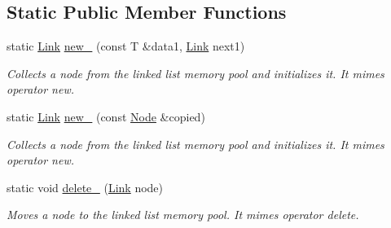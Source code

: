 \subsection*{Static Public Member Functions}
\begin{DoxyCompactItemize}
\item 
\hypertarget{structofeli_1_1list_1_1_node_ac75b630e0b50f5eee672e8a0a8aca132}{static \hyperlink{classofeli_1_1list_a7765ecb875543506d04dbd466f754503}{Link} \hyperlink{structofeli_1_1list_1_1_node_ac75b630e0b50f5eee672e8a0a8aca132}{new\-\_\-} (const T \&data1, \hyperlink{classofeli_1_1list_a7765ecb875543506d04dbd466f754503}{Link} next1)}\label{structofeli_1_1list_1_1_node_ac75b630e0b50f5eee672e8a0a8aca132}

\begin{DoxyCompactList}\small\item\em Collects a node from the linked list memory pool and initializes it. It mimes operator {\ttfamily new}. \end{DoxyCompactList}\item 
\hypertarget{structofeli_1_1list_1_1_node_a6b9d48c85eee2608978fe420d03b3e73}{static \hyperlink{classofeli_1_1list_a7765ecb875543506d04dbd466f754503}{Link} \hyperlink{structofeli_1_1list_1_1_node_a6b9d48c85eee2608978fe420d03b3e73}{new\-\_\-} (const \hyperlink{structofeli_1_1list_1_1_node}{Node} \&copied)}\label{structofeli_1_1list_1_1_node_a6b9d48c85eee2608978fe420d03b3e73}

\begin{DoxyCompactList}\small\item\em Collects a node from the linked list memory pool and initializes it. It mimes operator {\ttfamily new}. \end{DoxyCompactList}\item 
\hypertarget{structofeli_1_1list_1_1_node_a42cedc598273b73b0f2bc34f7cd10043}{static void \hyperlink{structofeli_1_1list_1_1_node_a42cedc598273b73b0f2bc34f7cd10043}{delete\-\_\-} (\hyperlink{classofeli_1_1list_a7765ecb875543506d04dbd466f754503}{Link} node)}\label{structofeli_1_1list_1_1_node_a42cedc598273b73b0f2bc34f7cd10043}

\begin{DoxyCompactList}\small\item\em Moves a node to the linked list memory pool. It mimes operator {\ttfamily delete}. \end{DoxyCompactList}\end{DoxyCompactItemize}
